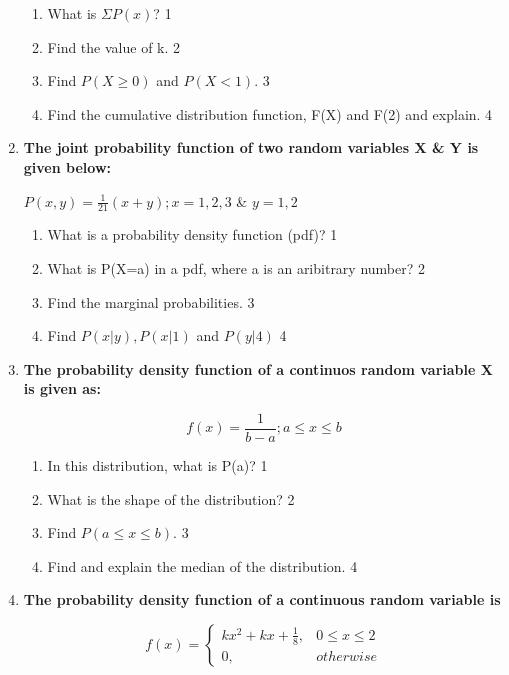 \documentclass[a4paper,oneside, margin=1.4in]{book}
\begin{document}
\begin{enumerate}
  \begin{enumerate}
    \item
	What is $\Sigma P(x)$? \hfill 1
    \item
	Find the value of k. \hfill 2
    \item  
	Find $P(X \geq 0)$ and $P(X < 1)$. \hfill 3
    \item
	Find the cumulative distribution function, F(X) and F(2) and explain. \hfill 4
  \end{enumerate}

 \item
	  \textbf{The joint probability function of two random variables X \& Y is given below:}

\begin{center}
$P(x,y) = \frac{1}{21}(x+y); x=1,2,3$ \& $y = 1,2$ 
\end{center}
  
  \begin{enumerate}
    \item
	What is a probability density function (pdf)? \hfill 1
    \item
	What is P(X=a) in a pdf, where a is an aribitrary number? \hfill 2
    \item  
	Find the marginal probabilities. \hfill 3
    \item
	Find $P(x \vert y), P(x \vert 1)$ and $P(y|4)$ \hfill 4
  \end{enumerate}
  
  \item
	  \textbf{The probability density function of a continuos random variable X is given as:}
	  
	  $$f(x) = \frac 1 {b-a}; a\le x\le b$$
  
  \begin{enumerate}
    \item
	In this distribution, what is P(a)? \hfill 1
    \item
    What is the shape of the distribution? \hfill 2	
    \item
	Find $P( a\le x\le b)$. \hfill 3
      \item
	Find and explain the median of the distribution. \hfill 4
  \end{enumerate}

 \item
  \textbf{The probability density function of a continuous random variable is}

$$
  f(x) =
\begin{cases}
kx^2+kx+ \frac 18,  & 0 \le x \le 2 \\
0, & otherwise
\end{cases}
$$


\end{enumerate}
\end{document}
